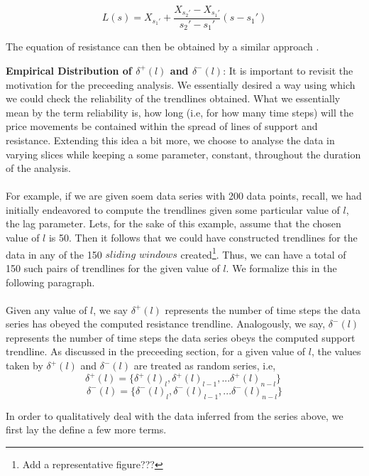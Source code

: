 \documentclass[letterpaper, 12pt] {article}
\let\oldmarginpar\marginpar
\renewcommand\marginpar[1]{\-\oldmarginpar[\raggedleft\footnotesize #1]%
	{\raggedright\footnotesize #1}}
\begin{document}
	\begin{equation*}
		L(s) = X_{s_1'} + \frac{X_{s_2'}-X_{s_1'}}{s_2' - s_1'} (s-s_1')
	\end{equation*}
	
	The equation of resistance can then be obtained by a similar approach \marginpar{refer to footnote 9}.
	\linebreak
	
	\textbf{Empirical Distribution of $\delta^+(l)$ and $\delta^-(l)$}: It is important to revisit the motivation for the preceeding analysis. We essentially desired a way using which we could check the reliability of the trendlines obtained. What we essentially mean by the term reliability is, how long (i.e, for how many time steps) will the price movements be contained within the spread of lines of support and resistance. Extending this idea a bit more, we choose to analyse the data in varying slices while keeping a some parameter, constant, throughout the duration of the analysis. 
	\paragraph{}
	For example, if we are given soem data series with 200 data points, recall, we had initially endeavored to compute the trendlines given some particular value of $l$, the lag parameter. Lets, for the sake of this example, assume that the chosen value of $l$ is 50. Then it follows that we could have constructed trendlines for the data in any of the 150 $sliding$ $windows$ created\footnote{Add a representative figure???}. Thus, we can have a total of 150 such pairs of trendlines for the given value of $l$. We formalize this in the following paragraph.
	
	\paragraph{}
	Given any value of $l$, we say $\delta^+(l)$ represents the number of time steps the data series has obeyed the computed resistance trendline. Analogously, we say, $\delta^-(l)$ represents the number of time steps the data series obeys the computed support trendline. As discussed in the preceeding section, for a given value of $l$, the values taken by $\delta^+(l)$ and $\delta^-(l)$ are treated as random series, i.e, 
	$$\delta^+(l) = \{\delta^+(l)_l, \delta^+(l)_{l-1}, ... \delta^+(l)_{n-l}\} \; $$
	$$\delta^-(l) = \{\delta^-(l)_l, \delta^-(l)_{l-1}, ... \delta^-(l)_{n-l}\}$$ 
	
	In order to qualitatively deal with the data inferred from the series above, we first lay the define a few more terms. 
	
\end{document}

